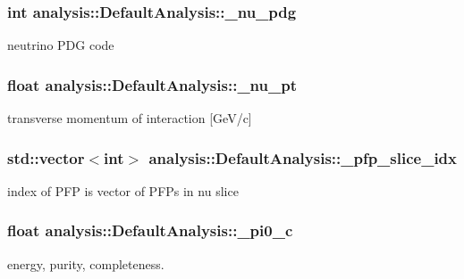 \subsubsection[{\texorpdfstring{\+\_\+nu\+\_\+pdg}{_nu_pdg}}]{\setlength{\rightskip}{0pt plus 5cm}int analysis\+::\+Default\+Analysis\+::\+\_\+nu\+\_\+pdg\hspace{0.3cm}{\ttfamily [private]}}\hypertarget{classanalysis_1_1DefaultAnalysis_a625c353bb8912893b77a14f44d4f00b0}{}\label{classanalysis_1_1DefaultAnalysis_a625c353bb8912893b77a14f44d4f00b0}
neutrino P\+DG code 
\subsubsection[{\texorpdfstring{\+\_\+nu\+\_\+pt}{_nu_pt}}]{\setlength{\rightskip}{0pt plus 5cm}float analysis\+::\+Default\+Analysis\+::\+\_\+nu\+\_\+pt\hspace{0.3cm}{\ttfamily [private]}}\hypertarget{classanalysis_1_1DefaultAnalysis_a901956985dfd610c781bedf7bfc9754a}{}\label{classanalysis_1_1DefaultAnalysis_a901956985dfd610c781bedf7bfc9754a}
transverse momentum of interaction \mbox{[}Ge\+V/c\mbox{]} 
\subsubsection[{\texorpdfstring{\+\_\+pfp\+\_\+slice\+\_\+idx}{_pfp_slice_idx}}]{\setlength{\rightskip}{0pt plus 5cm}std\+::vector$<$int$>$ analysis\+::\+Default\+Analysis\+::\+\_\+pfp\+\_\+slice\+\_\+idx\hspace{0.3cm}{\ttfamily [private]}}\hypertarget{classanalysis_1_1DefaultAnalysis_acbf0c279993cbefca72f38bc5e9f6627}{}\label{classanalysis_1_1DefaultAnalysis_acbf0c279993cbefca72f38bc5e9f6627}
index of P\+FP is vector of P\+F\+Ps in nu slice 
\subsubsection[{\texorpdfstring{\+\_\+pi0\+\_\+c}{_pi0_c}}]{\setlength{\rightskip}{0pt plus 5cm}float analysis\+::\+Default\+Analysis\+::\+\_\+pi0\+\_\+c\hspace{0.3cm}{\ttfamily [private]}}\hypertarget{classanalysis_1_1DefaultAnalysis_a255069926e7e8a83629b9dac19bf7473}{}\label{classanalysis_1_1DefaultAnalysis_a255069926e7e8a83629b9dac19bf7473}
energy, purity, completeness. 
